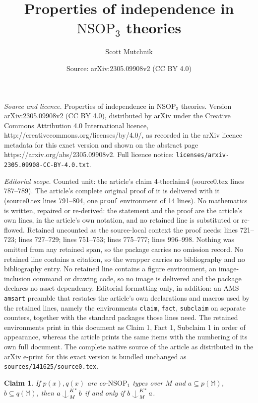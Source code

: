 \documentclass[10pt,a4paper]{amsart}
\title{Properties of independence in $\mathrm{NSOP}_{3}$ theories}
\author{Scott Mutchnik}
\date{Source: arXiv:2305.09908v2 (CC BY 4.0)}
\newtheorem{claim}{Claim}
\def\Ind#1#2{#1\setbox0=\hbox{$#1x$}\kern\wd0\hbox to 0pt{\hss$#1\mid$\hss}
\lower.9\ht0\hbox to 0pt{\hss$#1\smile$\hss}\kern\wd0}
\def\ind{\mathop{\mathpalette\Ind{}}}
\begin{document}
\maketitle

\noindent\emph{Source and licence.} Properties of independence in $\mathrm{NSOP}_{3}$ theories. Version arXiv:2305.09908v2 (CC BY 4.0), distributed by arXiv under the Creative Commons Attribution 4.0 International licence, http://creativecommons.org/licenses/by/4.0/, as recorded in the arXiv licence metadata for this exact version and shown on the abstract page https://arxiv.org/abs/2305.09908v2. Full licence notice: \texttt{licenses/arxiv-2305.09908-CC-BY-4.0.txt}.\par\smallskip

\noindent\textit{Editorial scope.} Counted unit: the article's claim 4-theclaim4 (source0.tex lines 787--789). The article's complete original proof of it is delivered with it (source0.tex lines 791--804, one \texttt{proof} environment of 14 lines). No mathematics is written, repaired or re-derived: the statement and the proof are the article's own lines, in the article's own notation, and no retained line is substituted or re-flowed.  Retained uncounted as the source-local context the proof needs: lines 721--723; lines 727--729; lines 751--753; lines 775--777; lines 996--998.  Nothing was omitted from any retained span, so the package carries no omission record.  No retained line contains a citation, so the wrapper carries no bibliography and no bibliography entry.  No retained line contains a figure environment, an image-inclusion command or drawing code, so no image is delivered and the package declares no asset dependency.  Editorial formatting only, in addition: an AMS \texttt{amsart} preamble that restates the article's own declarations and macros used by the retained lines, namely the environments \texttt{claim}, \texttt{fact}, \texttt{subclaim} on separate counters, together with the standard packages those lines need.  The retained environments print in this document as Claim 1, Fact 1, Subclaim 1 in order of appearance, whereas the article prints the same items with the numbering of its own full document.  The complete native source of the article as distributed in the arXiv e-print for this exact version is bundled unchanged as \texttt{sources/141625/source0.tex}.
\begin{claim}\label{4-symm4}
If $p(x), q(x)$ are co-$\mathrm{NSOP}_{1}$ types over $M$ and $a \subseteq p(\mathbb{M})$, $b \subseteq q(\mathbb{M})$, then $a\ind^{K^{*}}_{M}b$ if and only if $b\ind^{K^{*}}_{M}a$.    
\end{claim}
\end{document}
